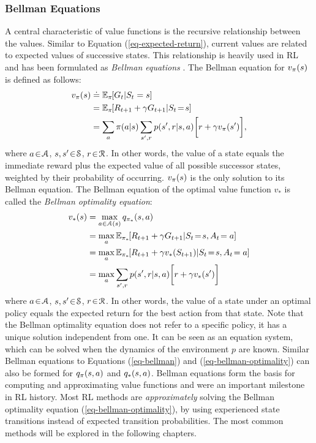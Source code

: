 \documentclass[a4paper, twoside, 12pt]{article}
\let\cite\shortcite
\begin{document}
\subsubsection{Bellman Equations}
\label{sec:orgf279355}
A central characteristic of value functions is the recursive relationship
between the values. Similar to Equation (\ref{eq-expected-return}), current values are
related to expected values of successive states. This relationship is heavily
used in RL and has been formulated as \emph{Bellman equations}
\cite{bellman57_dynam_progr}. The Bellman equation for \(\vpi(s)\) is defined as
follows:
\begin{equation} \label{eq-bellman}
\begin{split}
    \vpi(s) &\defeq \EE{\pi}{G_t|S_t=s} \\
    &= \EE{\pi}{R_{t+1}+\gamma G_{t+1}|S_t\!=\!s} \\
    &= \sum_{a}{\pi(a|s)}\sum_{s',r}{p(s',r|s,a)}\bigg[r+\gamma\vpi(s')\bigg],
\end{split}
\end{equation}
where \(a\!\in\!\A\), \(s,s'\!\in\!\S\), \(r\!\in\!\R\).
In other words, the value of a state equals the immediate reward plus the
expected value of all possible successor states, weighted by their probability
of occurring. \(\vpi(s)\) is the only solution to its Bellman equation. The
Bellman equation of the optimal value function \(v_*\) is called the \emph{Bellman
optimality equation}:
\begin{equation} \label{eq-bellman-optimality}
\begin{split}
    \vstar(s) &= \max_{a\in\A(s)}q_{\pi_*}(s,a) \\
    &= \max_{a}\EE{\pi_*}{R_{t+1}+\gamma G_{t+1}|S_t\!=\!s, A_t\!=a} \\
    &= \max_{a}\EE{\pi_*}{R_{t+1}+\gamma \vstar(S_{t+1})|S_t\!=\!s, A_t\!=a} \\
    &= \max_{a}\sum_{s',r}{p(s',r|s,a)}\bigg[r+\gamma\vstar(s')\bigg]
\end{split}
\end{equation}
where \(a\!\in\!\A\), \(s,s'\!\in\!\S\), \(r\!\in\!\R\). In other words, the value of
a state under an optimal policy equals the expected return for the best action
from that state. Note that the Bellman optimality equation does not refer to a
specific policy, it has a unique solution independent from one. It can be seen
as an equation system, which can be solved when the dynamics of the environment
\(p\) are known. Similar Bellman equations to Equations (\ref{eq-bellman}) and
(\ref{eq-bellman-optimality}) can also be formed for \(\qpi(s,a)\) and
\(\qstar(s,a)\). Bellman equations form the basis for computing and approximating
value functions and were an important milestone in RL history. Most RL methods
are \emph{approximately} solving the Bellman optimality equation
(\ref{eq-bellman-optimality}), by using experienced state transitions instead of
expected transition probabilities. The most common methods will be explored in
the following chapters.
\end{document}
